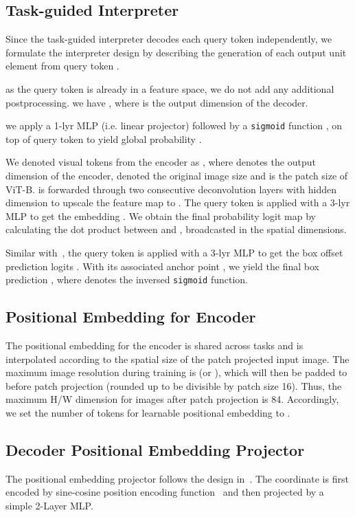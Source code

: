 \documentclass[10pt,twocolumn,letterpaper]{article}
\begin{document}
\subsection{Task-guided Interpreter}
Since the task-guided interpreter decodes each query token independently, we formulate the interpreter design by describing the generation of each output unit element  from query token .

as the query token is already in a feature space, we do not add any additional postprocessing. we have , where  is the output dimension of the decoder.

we apply a 1-lyr MLP (i.e. linear projector) followed by a \texttt{sigmoid} function , on top of query token  to yield global probability .

 We denoted visual tokens from the encoder as , where  denotes the output dimension of the encoder,  denoted the original image size and  is the patch size of ViT-B.  is forwarded through two consecutive  deconvolution layers with hidden dimension  to upscale the feature map to . The query token  is applied with a 3-lyr MLP to get the embedding . We obtain the final probability logit map  by calculating the dot product between  and , broadcasted in the spatial dimensions. 

 Similar with~\cite{zhu2020deformable}, the query token  is applied with a 3-lyr MLP to get the box offset prediction logits . With its associated anchor point , we yield the final box prediction , where  denotes the inversed \texttt{sigmoid} function.

\subsection{Positional Embedding for Encoder}
The positional embedding for the encoder is shared across tasks and is interpolated according to the spatial size of the patch projected input image. The maximum image resolution during training is  (or ), which will then be padded to  before patch projection (rounded up to be divisible by patch size 16). Thus, the maximum H/W dimension for images after patch projection is 84. Accordingly, we set the number of tokens for learnable positional embedding to .\subsection{Decoder Positional Embedding Projector}
The positional embedding projector  follows the design in~\cite{wang2022anchor}. The coordinate is first encoded by sine-cosine position encoding function~\cite{vaswani2017attention} and then projected by a simple 2-Layer MLP.
\end{document}
